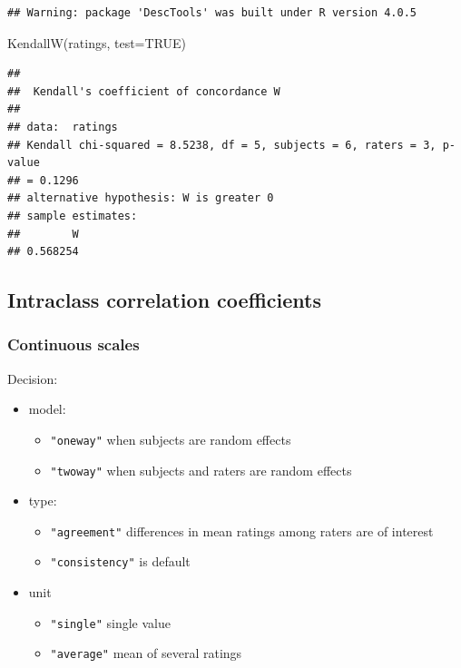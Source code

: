 \documentclass[
]{book}
\newenvironment{Shaded}{\begin{snugshade}}{\end{snugshade}}
\newcommand{\AttributeTok}[1]{\textcolor[rgb]{0.77,0.63,0.00}{#1}}
\newcommand{\ConstantTok}[1]{\textcolor[rgb]{0.00,0.00,0.00}{#1}}
\newcommand{\FunctionTok}[1]{\textcolor[rgb]{0.00,0.00,0.00}{#1}}
\newcommand{\NormalTok}[1]{#1}
\begin{document}
\begin{verbatim}
## Warning: package 'DescTools' was built under R version 4.0.5
\end{verbatim}

\begin{Shaded}
\begin{Highlighting}[]
\FunctionTok{KendallW}\NormalTok{(ratings, }\AttributeTok{test=}\ConstantTok{TRUE}\NormalTok{)}
\end{Highlighting}
\end{Shaded}

\begin{verbatim}
## 
##  Kendall's coefficient of concordance W
## 
## data:  ratings
## Kendall chi-squared = 8.5238, df = 5, subjects = 6, raters = 3, p-value
## = 0.1296
## alternative hypothesis: W is greater 0
## sample estimates:
##        W 
## 0.568254
\end{verbatim}

\hypertarget{intraclass-correlation-coefficients}{%
\subsection{Intraclass correlation coefficients}\label{intraclass-correlation-coefficients}}

\citep{Shrout_1979}

\hypertarget{continuous-scales}{%
\subsubsection{Continuous scales}\label{continuous-scales}}

Decision:

\begin{itemize}
\item
  model:

  \begin{itemize}
  \item
    \texttt{"oneway"} when subjects are random effects
  \item
    \texttt{"twoway"} when subjects and raters are random effects
  \end{itemize}
\item
  type:

  \begin{itemize}
  \item
    \texttt{"agreement"} differences in mean ratings among raters are of interest
  \item
    \texttt{"consistency"} is default
  \end{itemize}
\item
  unit

  \begin{itemize}
  \item
    \texttt{"single"} single value
  \item
    \texttt{"average"} mean of several ratings
  \end{itemize}
\end{itemize}
\end{document}
